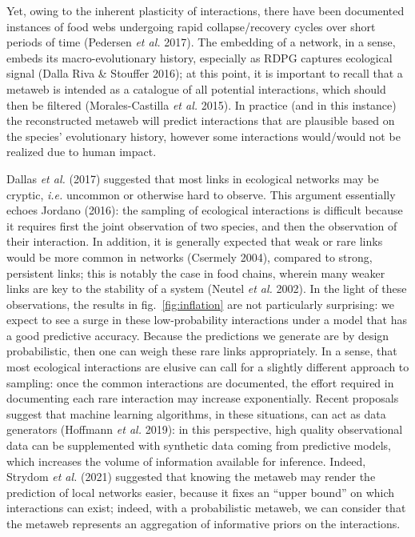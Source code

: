 \documentclass[11pt]{article}
\begin{document}
Yet, owing to the inherent plasticity of interactions, there have been
documented instances of food webs undergoing rapid collapse/recovery
cycles over short periods of time (Pedersen \emph{et al.} 2017). The
embedding of a network, in a sense, embeds its macro-evolutionary
history, especially as RDPG captures ecological signal (Dalla Riva \&
Stouffer 2016); at this point, it is important to recall that a metaweb
is intended as a catalogue of all potential interactions, which should
then be filtered (Morales-Castilla \emph{et al.} 2015). In practice (and
in this instance) the reconstructed metaweb will predict interactions
that are plausible based on the species' evolutionary history, however
some interactions would/would not be realized due to human impact.

Dallas \emph{et al.} (2017) suggested that most links in ecological
networks may be cryptic, \emph{i.e.} uncommon or otherwise hard to
observe. This argument essentially echoes Jordano (2016): the sampling
of ecological interactions is difficult because it requires first the
joint observation of two species, and then the observation of their
interaction. In addition, it is generally expected that weak or rare
links would be more common in networks (Csermely 2004), compared to
strong, persistent links; this is notably the case in food chains,
wherein many weaker links are key to the stability of a system (Neutel
\emph{et al.} 2002). In the light of these observations, the results in
fig.~\ref{fig:inflation} are not particularly surprising: we expect to
see a surge in these low-probability interactions under a model that has
a good predictive accuracy. Because the predictions we generate are by
design probabilistic, then one can weigh these rare links appropriately.
In a sense, that most ecological interactions are elusive can call for a
slightly different approach to sampling: once the common interactions
are documented, the effort required in documenting each rare interaction
may increase exponentially. Recent proposals suggest that machine
learning algorithms, in these situations, can act as data generators
(Hoffmann \emph{et al.} 2019): in this perspective, high quality
observational data can be supplemented with synthetic data coming from
predictive models, which increases the volume of information available
for inference. Indeed, Strydom \emph{et al.} (2021) suggested that
knowing the metaweb may render the prediction of local networks easier,
because it fixes an ``upper bound'' on which interactions can exist;
indeed, with a probabilistic metaweb, we can consider that the metaweb
represents an aggregation of informative priors on the interactions.
\end{document}
